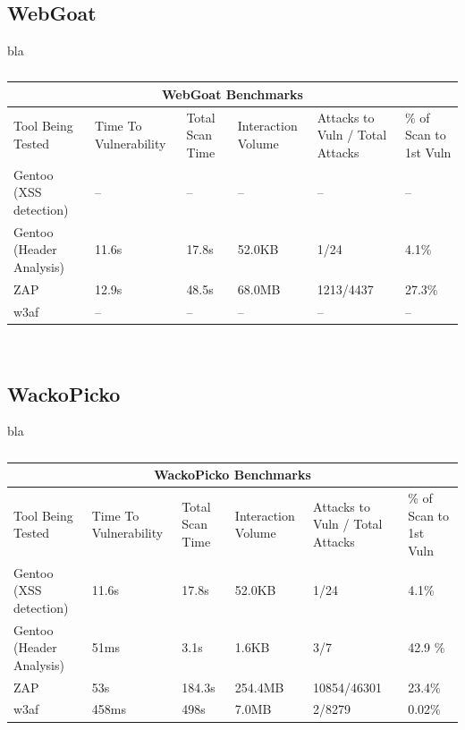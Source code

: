 \subsection{WebGoat}

bla

\begin{table}[h]
	
	{
		\captionsetup{justification=centering}		
		\caption{}
		\label{table:webgoat_benchmarks}
		\begin{tabular}{ |p{4cm}||p{1.4cm}|p{1.4cm}|p{1.6cm}|p{2cm}|p{2cm}| }
			\hline
			\multicolumn{6}{|c|}{\textbf{WebGoat Benchmarks}} \\ [0.5ex]
			\hline \hline 
			Tool Being Tested& Time To Vulnerability & Total Scan Time & Interaction Volume & Attacks to Vuln / Total Attacks & \% of Scan to 1st Vuln \\
			\hline
			Gentoo (XSS detection)    & --     & --    &   --          & -- & -- \\
			Gentoo (Header Analysis) &  11.6s   & 17.8s   & 52.0KB   & 1/24 & 4.1\%\\
			ZAP                                   & 12.9s &  48.5s   & 68.0MB  & 1213/4437 & 27.3\%\\ 
			w3af                                 & -- & -- & -- & -- & -- \\
			\hline
		\end{tabular}
	} \\
\end{table}

\subsection{WackoPicko}


bla

\begin{table}[h]
	
	{\rowcolors{3}{Apricot}{Wheat1}
		\captionsetup{justification=centering}		
		\caption{}
		\label{table:wackopicko_benchmarks}
		\begin{tabular}{ |p{4cm}||p{1.4cm}|p{1.4cm}|p{1.6cm}|p{2cm}|p{2cm}| }
			\hline
			\multicolumn{6}{|c|}{\textbf{WackoPicko Benchmarks}} \\ [0.5ex]
			\hline \hline 
			Tool Being Tested& Time To Vulnerability & Total Scan Time & Interaction Volume & Attacks to Vuln / Total Attacks & \% of Scan to 1st Vuln \\
			\hline
			Gentoo (XSS detection)    &   11.6s   &  17.8s   &  52.0KB           & 1/24 & 4.1\% \\
			Gentoo (Header Analysis) &  51ms &  3.1s  &  1.6KB  & 3/7 & 42.9 \%\\
			ZAP                                   & 53s &  184.3s   & 254.4MB & 10854/46301 & 23.4\%\\ 
			w3af                                 & 458ms & 498s & 7.0MB & 2/8279 & 0.02\% \\
			\hline
		\end{tabular}
	} \\
\end{table}


